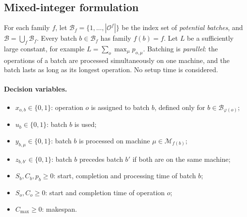 \documentclass[11pt,a4paper]{article}
\newcommand{\Oset}{\mathcal{O}}
\newcommand{\Mset}{\mathcal{M}}
\newcommand{\Bset}{\mathcal{B}}
\begin{document}
\subsection{Mixed-integer formulation}
For each family $f$, let $\Bset_f=\{1,\dots,|\Oset^f|\}$ be the index set of
\emph{potential batches}, and $\Bset=\bigcup_f\Bset_f$. Every batch $b\in\Bset_f$
has family $f(b)=f$. Let $L$ be a sufficiently large constant, for example
$L=\sum_{o}\max_\mu p_{o,\mu}$.
Batching is \emph{parallel}: the operations of a batch are processed
simultaneously on one machine, and the batch lasts as long as its longest
operation. No setup time is considered.

\paragraph{Decision variables.}
\begin{itemize}
  \item $x_{o,b}\in\{0,1\}$: operation $o$ is assigned to batch $b$, defined only for $b\in\Bset_{\varphi(o)}$;
  \item $u_b\in\{0,1\}$: batch $b$ is used;
  \item $y_{b,\mu}\in\{0,1\}$: batch $b$ is processed on machine $\mu\in\Mset_{f(b)}$;
  \item $z_{b,b'}\in\{0,1\}$: batch $b$ precedes batch $b'$ if both are on the same machine;
  \item $S_b, C_b, p_b\ge 0$: start, completion and processing time of batch $b$;
  \item $S_o, C_o\ge 0$: start and completion time of operation $o$;
  \item $C_{\max}\ge 0$: makespan.
\end{itemize}
\end{document}
